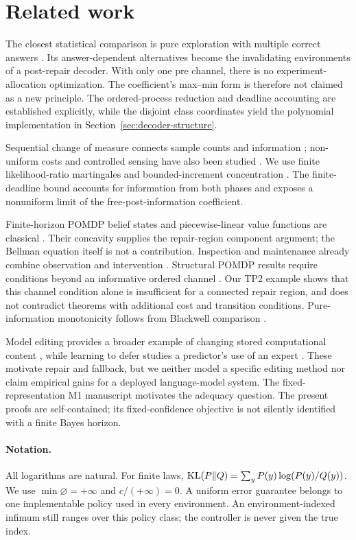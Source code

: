 \section{Related work}
\label{sec:related}
The closest statistical comparison is pure exploration with multiple correct
answers \citep{degenne2019}. Its answer-dependent alternatives become the
invalidating environments of a post-repair decoder. With only one pre channel,
there is no experiment-allocation optimization. The coefficient's max--min
form is therefore not claimed as a new principle. The ordered-process
reduction and deadline accounting are established explicitly, while the
disjoint class coordinates yield the polynomial implementation in
Section~\ref{sec:decoder-structure}.

Sequential change of measure connects sample counts and information
\citep{kaufmann2016}; non-uniform costs and controlled sensing have also been
studied \citep{nitinawarat2015}. We use finite likelihood-ratio martingales and
bounded-increment concentration \citep{hoeffding1963}. The finite-deadline
bound accounts for information from both phases and exposes a nonuniform
limit of the free-post-information coefficient.

Finite-horizon POMDP belief states and piecewise-linear value functions are
classical \citep{smallwood1973}. Their concavity supplies the repair-region
component argument; the Bellman equation itself is not a contribution.
Inspection and maintenance already combine observation and intervention
\citep{morato2022,zhang2023}. Structural POMDP results require conditions beyond
an informative ordered channel \citep{krishnamurthy2018}. Our TP2 example shows
that this channel condition alone is insufficient for a connected repair
region, and does not contradict theorems with additional cost and transition
conditions. Pure-information monotonicity follows from Blackwell comparison
\citep{blackwell1953}.

Model editing provides a broader example of changing stored computational
content \citep{meng2022memit}, while learning to defer studies a predictor's
use of an expert \citep{mozannar2020defer}. These motivate repair and fallback,
but we neither model a specific editing method nor claim empirical gains for
a deployed language-model system. The fixed-representation M1 manuscript
\citep{huang2026} motivates the adequacy question. The present proofs are
self-contained; its fixed-confidence objective is not silently identified
with a finite Bayes horizon.

\paragraph{Notation.}
All logarithms are natural. For finite laws,
$\operatorname{KL}(P\Vert Q)=\sum_yP(y)\log(P(y)/Q(y))$.
We use $\min\varnothing=+\infty$ and $c/(+\infty)=0$.
A uniform error guarantee belongs to one implementable policy used in every
environment. An environment-indexed infimum still ranges over this policy
class; the controller is never given the true index.
